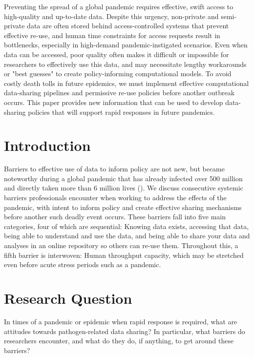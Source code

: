 \documentclass{CUP-JNL-DAP}%
\begin{document}
\begin{Frontmatter}
\begin{policy}
Preventing the spread of a global pandemic requires effective, swift access to high-quality and up-to-date data. Despite this urgency, non-private and semi-private data are often stored behind access-controlled systems that prevent effective re-use, and human time constraints for access requests result in bottlenecks, especially in high-demand pandemic-instigated scenarios. Even when data can be accessed, poor quality often makes it difficult or impossible for researchers to effectively use this data, and may necessitate lengthy workarounds or "best guesses" to create policy-informing computational models. To avoid costly death tolls in future epidemics, we must implement effective computational data-sharing pipelines and permissive re-use policies before another outbreak occurs. This paper provides new information that can be used to develop data-sharing policies that will support rapid responses in future pandemics.


\end{policy}
\end{Frontmatter}


\section{Introduction}
Barriers to effective use of data to inform policy are not new, but became noteworthy during a global pandemic that has already infected over 500 million and directly taken more than 6 million lives (\cite{owidcoronavirus}). We discuss consecutive systemic barriers professionals encounter when working to address the effects of the pandemic, with intent to inform policy and create effective sharing mechanisms before another such deadly event occurs. These barriers fall into five main categories, four of which are sequential: Knowing data exists, accessing that data, being able to understand and use the data, and being able to share your data and analyses in an online repository so others can re-use them. Throughout this, a fifth barrier is interwoven: Human throughput capacity, which may be stretched even before acute stress periods such as a pandemic.

\section{Research Question}
In times of a pandemic or epidemic when rapid response is required, what are attitudes towards pathogen-related data sharing? In particular, what barriers do researchers encounter, and what do they do, if anything, to get around these barriers? 
\end{document}
